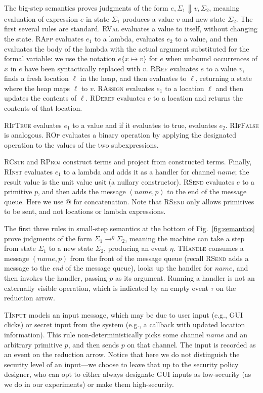 \documentclass{llncs}
\newcommand{\code}[1]{\textsf{#1}} \newcommand{\bcode}[1]{\texttt{#1}}
\newcommand{\aset}[1]{\{#1\}}
\newcommand{\sfmt}[1]{\textsf{#1}}
\newcommand{\sch}{\textit{name}}
\newcommand{\loc}{\ell}
\newcommand{\sunit}{\sfmt{unit}}
\newcommand{\sreduce}{\Downarrow}
\newcommand{\treduce}{\rightarrow}
\newcommand{\xv}{p}
\newcommand{\evt}{\eta}
\begin{document}
The big-step semantics proves judgments of the form
$e, \Sigma_1 \sreduce v, \Sigma_2$, meaning
evaluation of expression $e$ in state $\Sigma_1$ produces a value $v$ and
new state $\Sigma_2$. 
The first several rules are standard.
\textsc{RVal} evaluates a value to itself, without changing the
state. \textsc{RApp} evaluates $e_1$ to a lambda, evaluates $e_2$ to
a value, and then evaluates the body of the lambda with the actual
argument substituted for the formal variable: we use the notation
$e\aset{x\mapsto v}$ for $e$ when unbound occurrences of $x$ in $e$
have been syntactically replaced with $v$. 
\textsc{RRef} evaluates $e$ to a value $v$, finds a fresh location
$\loc$ in the heap, and then evaluates to $\loc$, returning a state
where the heap maps $\loc$ to $v$. \textsc{RAssign} evaluates $e_1$
to a location $\loc$ and then updates the contents of
$\loc$. \textsc{RDeref} evaluates $e$ to a location and returns the
contents of that location.

\textsc{RIfTrue} evaluates $e_1$ to a value and if it evaluates to
\code{true}, evaluates $e_2$. \textsc{RIfFalse} is
analogous.
\textsc{ROp} evaluates a binary operation by applying the designated
operation to the values of the two subexpressions.


\textsc{RCstr} and \textsc{RProj} construct terms and project from
constructed terms. Finally, \textsc{RInst} evaluates $e_1$ to a lambda
and adds it as a handler for channel $\sch$; the result value is the
unit value $\sunit$ (a nullary constructor). \textsc{RSend} evaluates
$e$ to a primitive $\xv$, and then adds the message $(\sch,\xv)$ to the
end of the message queue. Here we use $@$ for concatenation. Note that \textsc{RSend} only allows
primitives to be sent, and not locations or lambda
expressions.

The first three rules 
in small-step semantics at the bottom of
Fig.~\ref{fig:semantics} prove judgments of the form
$\Sigma_1 \treduce^{\evt} \Sigma_2$, meaning the machine can take a step from state
$\Sigma_1$ to a new state $\Sigma_2$, producing an event $\evt$.
\textsc{THandle} consumes a message $(\sch, \xv)$ from the front of
the message queue (recall \textsc{RSend} adds a message to the
\emph{end}  of the message queue), looks up the handler for $\sch$,
and then invokes the handler, passing $\xv$ as its argument. Running a
handler is not an externally visible operation, which is indicated by an empty
event $\tau$ on the reduction arrow. 

\textsc{TInput} models an input message, which may be due to user
input (e.g., GUI clicks) or secret input from the system (e.g.,
a callback with updated location information). This rule
non-deterministically picks some channel $\sch$ and an arbitrary
primitive $p$, and then sends $p$ on that channel. 
The input is recorded as an event on the reduction arrow.
Notice that here we do not distinguish the security level of an input---we choose to leave that
up to the security policy designer, who can opt to either always
designate GUI inputs as low-security (as we do in our experiments) or
make them high-security.
\end{document}
